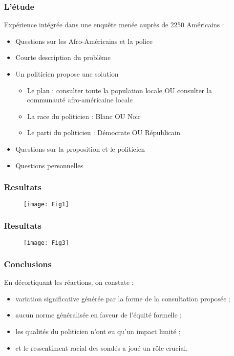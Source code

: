\documentclass[14pt]{beamer}
\begin{document}
\begin{frame}
\frametitle{L'étude}
Expérience intégrée dans une enquête menée auprès de 2250 Américains :\\
\bigskip

\begin{itemize}
	\pause 
	\item Questions sur les Afro-Américains et la police  
	\pause 
	\item Courte description du problème 
	\pause 
	\item Un politicien propose une solution
	\begin{itemize}
		\pause 
		\item Le plan : consulter toute la population locale OU consulter la communauté afro-américaine locale
		\pause 
		\item La race du politicien : Blanc OU Noir 
		\pause 
		\item Le parti du politicien : Démocrate OU Républicain
	\end{itemize}
	\pause 
	\item Questions sur la proposition et le politicien
	\pause 
	\item Questions personnelles 
\end{itemize}
\end{frame}

\begin{frame}
	\frametitle{Resultats}
	\begin{figure}
		\texttt{[image: Fig1]}
	\end{figure}
\end{frame}

\begin{frame}
	\frametitle{Resultats}
	\begin{figure}
		\texttt{[image: Fig3]}
	\end{figure}
\end{frame}

\begin{frame}
	\frametitle{Conclusions}
	En décortiquant les réactions, on constate :
	\begin{itemize}
		\pause 
		\item variation significative générée par la forme de la consultation proposée ;
		\pause 
		\item aucun norme généralisée en faveur de l'équité formelle ;  
		\pause 
		\item les qualités du politicien n'ont eu qu'un impact limité ;
		\pause 
		\item et le ressentiment racial des sondés a joué un rôle crucial. 
	\end{itemize}
	
\end{frame}
\end{document}
